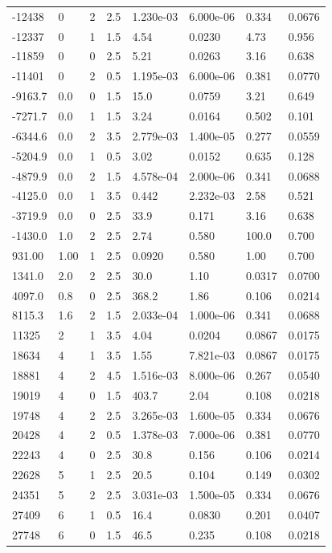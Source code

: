 \documentclass[preview]{standalone}
\begin{document}
{{\begin{tabular}{L{1.2cm}C{1.2cm} C{0.3cm}C{0.5cm} C{1.4cm}C{1.4cm} C{1.4cm}C{1.4cm}}
  -12438  &     0  & 2     & 2.5 &  1.230e-03  & 6.000e-06  & 0.334 &  0.0676   \\ 
  -12337  &     0  & 1     & 1.5 &  4.54  & 0.0230  & 4.73 &  0.956   \\ 
  -11859  &     0  & 0     & 2.5 &  5.21  & 0.0263  & 3.16 &  0.638   \\ 
  -11401  &     0  & 2     & 0.5 &  1.195e-03  & 6.000e-06  & 0.381 &  0.0770   \\ 
  -9163.7  &   0.0  & 0     & 1.5 &  15.0  & 0.0759  & 3.21 &  0.649   \\ 
  -7271.7  &   0.0  & 1     & 1.5 &  3.24  & 0.0164  & 0.502 &  0.101   \\ 
  -6344.6  &   0.0  & 2     & 3.5 &  2.779e-03  & 1.400e-05  & 0.277 &  0.0559   \\ 
  -5204.9  &   0.0  & 1     & 0.5 &  3.02  & 0.0152  & 0.635 &  0.128   \\ 
  -4879.9  &   0.0  & 2     & 1.5 &  4.578e-04  & 2.000e-06  & 0.341 &  0.0688   \\ 
  -4125.0  &   0.0  & 1     & 3.5 &  0.442  & 2.232e-03  & 2.58 &  0.521   \\ 
  -3719.9  &   0.0  & 0     & 2.5 &  33.9  & 0.171  & 3.16 &  0.638   \\ 
  -1430.0  &   1.0  & 2     & 2.5 &  2.74  & 0.580  & 100.0 &  0.700   \\ 
  931.00  &  1.00  & 1     & 2.5 &  0.0920  & 0.580  & 1.00 &  0.700   \\ 
  1341.0  &   2.0  & 2     & 2.5 &  30.0  & 1.10  & 0.0317 &  0.0700   \\ 
  4097.0  &   0.8  & 0     & 2.5 &  368.2  & 1.86  & 0.106 &  0.0214   \\ 
  8115.3  &   1.6  & 2     & 1.5 &  2.033e-04  & 1.000e-06  & 0.341 &  0.0688   \\ 
  11325  &     2  & 1     & 3.5 &  4.04  & 0.0204  & 0.0867 &  0.0175   \\ 
  18634  &     4  & 1     & 3.5 &  1.55  & 7.821e-03  & 0.0867 &  0.0175   \\ 
  18881  &     4  & 2     & 4.5 &  1.516e-03  & 8.000e-06  & 0.267 &  0.0540   \\ 
  19019  &     4  & 0     & 1.5 &  403.7  & 2.04  & 0.108 &  0.0218   \\ 
  19748  &     4  & 2     & 2.5 &  3.265e-03  & 1.600e-05  & 0.334 &  0.0676   \\ 
  20428  &     4  & 2     & 0.5 &  1.378e-03  & 7.000e-06  & 0.381 &  0.0770   \\ 
  22243  &     4  & 0     & 2.5 &  30.8  & 0.156  & 0.106 &  0.0214   \\ 
  22628  &     5  & 1     & 2.5 &  20.5  & 0.104  & 0.149 &  0.0302   \\ 
  24351  &     5  & 2     & 2.5 &  3.031e-03  & 1.500e-05  & 0.334 &  0.0676   \\ 
  27409  &     6  & 1     & 0.5 &  16.4  & 0.0830  & 0.201 &  0.0407   \\ 
  27748  &     6  & 0     & 1.5 &  46.5  & 0.235  & 0.108 &  0.0218   \\ 
\hline 
\end{tabular} 

}}
\end{document}
